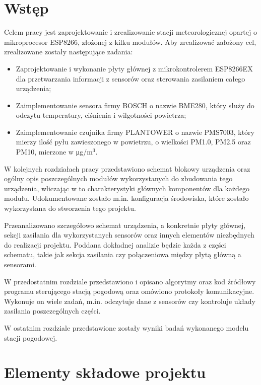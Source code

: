 \documentclass[12pt,a4paper,oneside]{memoir}
\begin{document}
\chapter{Wstęp}
	\hspace{\parindent} Celem pracy jest zaprojektowanie i zrealizowanie stacji meteorologicznej opartej o mikroprocesor ESP8266, złożonej z kilku modułów. Aby zrealizować założony cel, zrealizowane zostały następujące zadania:
	\begin{itemize}{}{}
		\item Zaprojektowanie i wykonanie płyty głównej z mikrokontrolerem ESP8266EX dla przetwarzania informacji z sensorów oraz sterowania zasilaniem całego urządzenia;
		\item Zaimplementowanie sensora firmy BOSCH o nazwie BME280, który służy do odczytu temperatury, ciśnienia i wilgotności powietrza;
		\item Zaimplementowanie czujnika firmy PLANTOWER o nazwie PMS7003, który mierzy ilość pyłu zawieszonego w powietrzu, o wielkości PM1.0, PM2.5 oraz PM10, mierzone w \si\micro g/m$^{3}$.
	\end{itemize}
	\par W kolejnych rozdziałach pracy przedstawiono schemat blokowy urządzenia oraz ogólny opis poszczególnych modułów wykorzystanych do zbudowania tego urządzenia, wliczając w to charakterystyki głównych komponentów dla każdego modułu. Udokumentowane zostało m.in. konfiguracja środowiska, które zostało wykorzystana do stworzenia tego projektu.
	\par Przeanalizowano szczegółowo schemat urządzenia, a konkretnie płyty głównej, sekcji zasilania dla wykorzystanych sensorów oraz innych elementów niezbędnych do realizacji projektu. Poddana dokładnej analizie będzie każda z części schematu, takie jak sekcja zasilania czy połączeniowa między płytą główną a sensorami.
	\par  W przedostatnim rozdziale przedstawiono i opisano algorytmy oraz kod źródłowy programu sterującego stacją pogodową oraz omówiono protokoły komunikacyjne. Wykonuje on wiele zadań, m.in. odczytuje dane z sensorów czy kontroluje układy zasilania poszczególnych części.
	\par W ostatnim rozdziale przedstawione zostały wyniki badań wykonanego modelu stacji pogodowej.

\chapter{Elementy składowe projektu} 
\end{document}
